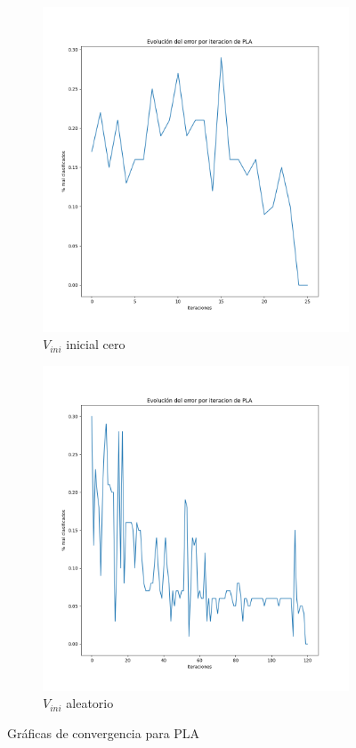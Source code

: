 \documentclass[11pt]{article}
\begin{document}
\begin{figure}[H]
    \begin{subfigure}{0.3\textwidth}
        \includegraphics[scale=0.3]{grafica_convergencia_pla_cero}
        \caption{$V_{ini}$ inicial cero}
    \end{subfigure} \hspace{0.2\textwidth}
    \begin{subfigure}{0.3\textwidth}
        \includegraphics[scale=0.3]{grafica_convergencia_pla_aleatorio}
        \caption{$V_{ini}$ aleatorio}
    \end{subfigure}
    \caption{Gráficas de convergencia para PLA}
\end{figure}
\end{document}
